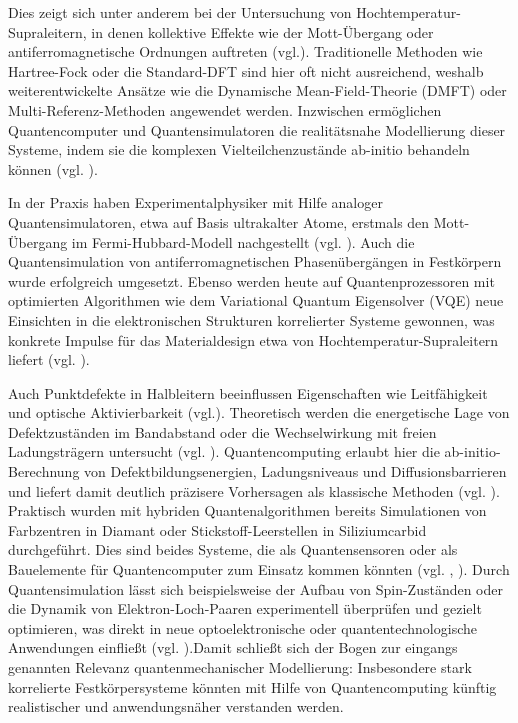 Dies zeigt sich unter anderem bei der Untersuchung von Hochtemperatur-Supraleitern, in denen kollektive Effekte wie der Mott-Übergang oder antiferromagnetische Ordnungen auftreten (vgl.\cite{daley_practical_2022}). Traditionelle Methoden wie Hartree-Fock oder die Standard-DFT sind hier oft nicht ausreichend, weshalb weiterentwickelte Ansätze wie die Dynamische Mean-Field-Theorie (DMFT) oder Multi-Referenz-Methoden angewendet werden. Inzwischen ermöglichen Quantencomputer und Quantensimulatoren die realitätsnahe Modellierung dieser Systeme, indem sie die komplexen Vielteilchenzustände ab-initio behandeln können (vgl. \cite{baker_simulating_2024}).

In der Praxis haben Experimentalphysiker mit Hilfe analoger Quantensimulatoren, etwa auf Basis ultrakalter Atome, erstmals den Mott-Übergang im Fermi-Hubbard-Modell nachgestellt (vgl. \cite{daley_practical_2022}). Auch die Quantensimulation von antiferromagnetischen Phasenübergängen in Festkörpern wurde erfolgreich umgesetzt. Ebenso werden heute auf Quantenprozessoren mit optimierten Algorithmen wie dem Variational Quantum Eigensolver (VQE) neue Einsichten in die elektronischen Strukturen korrelierter Systeme gewonnen, was konkrete Impulse für das Materialdesign etwa von Hochtemperatur-Supraleitern liefert (vgl. \cite{weidman_quantum_2024}).

Auch Punktdefekte in Halbleitern beeinflussen Eigenschaften wie Leitfähigkeit und optische Aktivierbarkeit (vgl.\cite{bassett_quantum_2019}). Theoretisch werden die energetische Lage von Defektzuständen im Bandabstand oder die Wechselwirkung mit freien Ladungsträgern untersucht (vgl. \cite{freysoldt_first-principles_2014}). Quantencomputing erlaubt hier die ab-initio-Berechnung von Defektbildungsenergien, Ladungsniveaus und Diffusionsbarrieren und liefert damit deutlich präzisere Vorhersagen als klassische Methoden (vgl. \cite{bassett_quantum_2019}).
Praktisch wurden mit hybriden Quantenalgorithmen bereits Simulationen von Farbzentren in Diamant oder Stickstoff-Leerstellen in Siliziumcarbid durchgeführt. Dies sind beides Systeme, die als Quantensensoren oder als Bauelemente für Quantencomputer zum Einsatz kommen könnten  (vgl. \cite{baker_simulating_2024}, \cite{cao_ab_2023}). Durch Quantensimulation lässt sich beispielsweise der Aufbau von Spin-Zuständen oder die Dynamik von Elektron-Loch-Paaren experimentell überprüfen und gezielt optimieren, was direkt in neue optoelektronische oder quantentechnologische Anwendungen einfließt (vgl. \cite{cao_ab_2023}).Damit schließt sich der Bogen zur eingangs genannten Relevanz quantenmechanischer Modellierung: Insbesondere stark korrelierte Festkörpersysteme könnten mit Hilfe von Quantencomputing künftig realistischer und anwendungsnäher verstanden werden.

